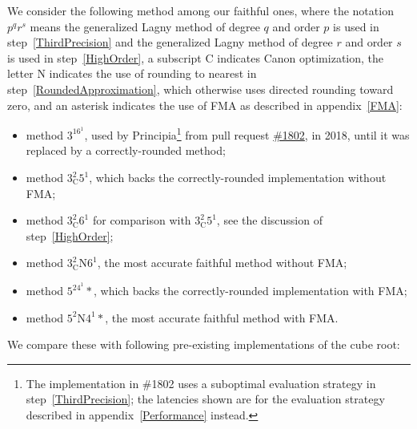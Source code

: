 ﻿\documentclass[10pt, a4paper, twoside]{basestyle}
\begin{document}
We consider the following method among our faithful ones, where the notation $p^qr^s$ means the generalized Lagny method of
degree $q$ and order $p$ is used in step~\ref{ThirdPrecision} and the generalized Lagny method of degree $r$ and order $s$
is used in step~\ref{HighOrder}, a subscript $\mathrm{C}$ indicates Canon optimization, the letter $\mathrm{N}$ indicates
the use of rounding to nearest in step~\ref{RoundedApproximation}, which otherwise uses directed rounding toward zero, and an
asterisk indicates the use of FMA as described in appendix~\ref{FMA}:
\begin{itemize}[nosep]
\item method $3^16^1$, used by Principia\footnote{The implementation in \#1802 uses a suboptimal evaluation strategy in step~\ref{ThirdPrecision}; the latencies shown are for the evaluation strategy described in appendix~\ref{Performance} instead.}
from pull request \href{https://github.com/mockingbirdnest/Principia/pull/1802}{\#1802},
in 2018, until it was replaced by a correctly-rounded method;
\item method $3^2_{\mathrm{C}}5^1$, which backs the correctly-rounded implementation without FMA;
\item method $3^2_{\mathrm{C}}6^1$ for comparison with $3^2_{\mathrm{C}}5^1$, see the discussion of step~\ref{HighOrder};
\item method $3^2_{\mathrm{C}}\mathrm{N}6^1$, the most accurate faithful method without FMA;
\item method $5^24^1*$, which backs the correctly-rounded implementation with FMA;
\item method $5^2\mathrm{N}4^1*$, the most accurate faithful method with FMA.
\end{itemize}
We compare these with following pre-existing implementations of the cube root:
\end{document}
